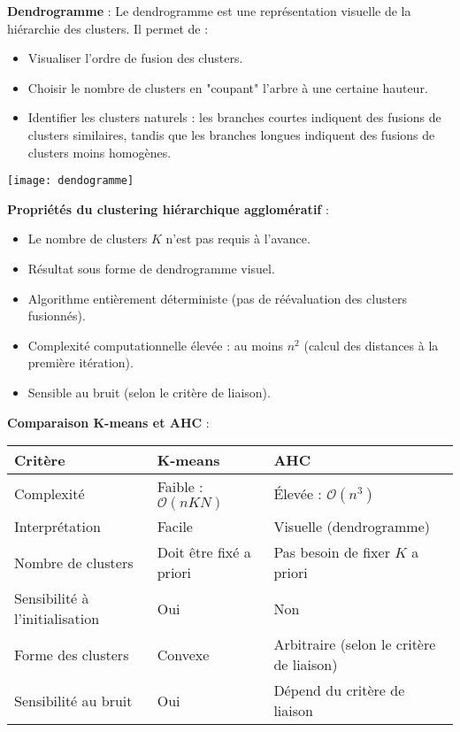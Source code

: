 \documentclass[10pt,a4paper]{article}
\begin{document}
\textbf{Dendrogramme} :
Le dendrogramme est une représentation visuelle de la hiérarchie des clusters. Il permet de :
\begin{itemize}
    \item Visualiser l'ordre de fusion des clusters.
    \item Choisir le nombre de clusters en "coupant" l'arbre à une certaine hauteur.
    \item Identifier les clusters naturels : les branches courtes indiquent des fusions de clusters similaires, tandis que les branches longues indiquent des fusions de clusters moins homogènes.
\end{itemize}

\texttt{[image: dendogramme]}

\textbf{Propriétés du clustering hiérarchique agglomératif} :
\begin{itemize}
    \item Le nombre de clusters $K$ n'est pas requis à l'avance.
    \item Résultat sous forme de dendrogramme visuel.
    \item Algorithme entièrement déterministe (pas de réévaluation des clusters fusionnés).
    \item Complexité computationnelle élevée : au moins $n^2$ (calcul des distances à la première itération).
    \item Sensible au bruit (selon le critère de liaison).
\end{itemize}

\textbf{Comparaison K-means et AHC} :
\begin{table}[h]
\centering
\begin{tabular}{|l|l|l|}
\hline
\textbf{Critère} & \textbf{K-means} & \textbf{AHC} \\ \hline
Complexité & Faible : $\mathcal{O}(n K N)$ & Élevée : $\mathcal{O}(n^3)$ \\ \hline
Interprétation & Facile & Visuelle (dendrogramme) \\ \hline
Nombre de clusters & Doit être fixé a priori & Pas besoin de fixer $K$ a priori \\ \hline
Sensibilité à l'initialisation & Oui & Non \\ \hline
Forme des clusters & Convexe & Arbitraire (selon le critère de liaison) \\ \hline
Sensibilité au bruit & Oui & Dépend du critère de liaison \\ \hline
\end{tabular}
\end{table}
\end{document}
